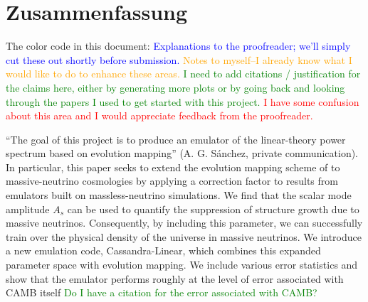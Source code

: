 

\chapter*{Zusammenfassung}

The color code in this document: \textcolor{blue}{Explanations to the
proofreader; we'll simply cut these out shortly before submission.}
\textcolor{orange}{Notes to myself--I already know what I would like to do to
enhance these areas.} \textcolor{green}{I need to add citations / 
justification for the claims here, either by generating more plots or by going
back and looking through the papers I used to get started with this project.}
\textcolor{red}{I have some confusion about this area and I would appreciate
feedback from the proofreader.}

``The goal of this project is to produce an emulator of the linear-theory
power spectrum based on evolution mapping'' (A. G. S\'{a}nchez, private
communication). In particular, this paper seeks to extend the evolution
mapping scheme of  to massive-neutrino cosmologies by applying a
correction
factor to results from emulators built on massless-neutrino simulations. We
find that the scalar mode amplitude $A_s$ can be used to quantify the
suppression of structure growth due to massive neutrinos. Consequently, by
including this parameter, we can successfully train over the physical density
of the universe in massive neutrinos. We introduce a new emulation code,
Cassandra-Linear, which combines this expanded parameter space with evolution
mapping. We include various error statistics and show that the emulator
performs roughly at the level of error associated with CAMB itself
\textcolor{green}{Do I have a citation for the error associated with CAMB?}